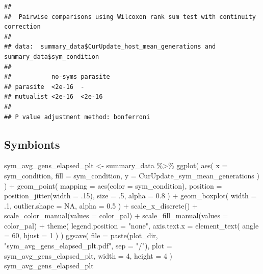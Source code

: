 \documentclass[
]{book}
\newenvironment{Shaded}{\begin{snugshade}}{\end{snugshade}}
\newcommand{\AttributeTok}[1]{\textcolor[rgb]{0.77,0.63,0.00}{#1}}
\newcommand{\ConstantTok}[1]{\textcolor[rgb]{0.00,0.00,0.00}{#1}}
\newcommand{\DecValTok}[1]{\textcolor[rgb]{0.00,0.00,0.81}{#1}}
\newcommand{\FloatTok}[1]{\textcolor[rgb]{0.00,0.00,0.81}{#1}}
\newcommand{\FunctionTok}[1]{\textcolor[rgb]{0.00,0.00,0.00}{#1}}
\newcommand{\NormalTok}[1]{#1}
\newcommand{\OtherTok}[1]{\textcolor[rgb]{0.56,0.35,0.01}{#1}}
\newcommand{\SpecialCharTok}[1]{\textcolor[rgb]{0.00,0.00,0.00}{#1}}
\newcommand{\StringTok}[1]{\textcolor[rgb]{0.31,0.60,0.02}{#1}}
\begin{document}
\begin{verbatim}
## 
##  Pairwise comparisons using Wilcoxon rank sum test with continuity correction 
## 
## data:  summary_data$CurUpdate_host_mean_generations and summary_data$sym_condition 
## 
##           no-syms parasite
## parasite  <2e-16  -       
## mutualist <2e-16  <2e-16  
## 
## P value adjustment method: bonferroni
\end{verbatim}

\hypertarget{symbionts}{%
\subsection{Symbionts}\label{symbionts}}

\begin{Shaded}
\begin{Highlighting}[]
\NormalTok{sym\_avg\_gens\_elapsed\_plt }\OtherTok{\textless{}{-}}\NormalTok{ summary\_data }\SpecialCharTok{\%\textgreater{}\%}
  \FunctionTok{ggplot}\NormalTok{(}
    \FunctionTok{aes}\NormalTok{(}
      \AttributeTok{x =}\NormalTok{ sym\_condition,}
      \AttributeTok{fill =}\NormalTok{ sym\_condition,}
      \AttributeTok{y =}\NormalTok{ CurUpdate\_sym\_mean\_generations}
\NormalTok{    )}
\NormalTok{  ) }\SpecialCharTok{+}
  \FunctionTok{geom\_point}\NormalTok{(}
    \AttributeTok{mapping =} \FunctionTok{aes}\NormalTok{(}\AttributeTok{color =}\NormalTok{ sym\_condition),}
    \AttributeTok{position =} \FunctionTok{position\_jitter}\NormalTok{(}\AttributeTok{width =}\NormalTok{ .}\DecValTok{15}\NormalTok{),}
    \AttributeTok{size =}\NormalTok{ .}\DecValTok{5}\NormalTok{,}
    \AttributeTok{alpha =} \FloatTok{0.8}
\NormalTok{  ) }\SpecialCharTok{+}
  \FunctionTok{geom\_boxplot}\NormalTok{(}
    \AttributeTok{width =}\NormalTok{ .}\DecValTok{1}\NormalTok{,}
    \AttributeTok{outlier.shape =} \ConstantTok{NA}\NormalTok{,}
    \AttributeTok{alpha =} \FloatTok{0.5}
\NormalTok{  ) }\SpecialCharTok{+}
  \FunctionTok{scale\_x\_discrete}\NormalTok{() }\SpecialCharTok{+}
  \FunctionTok{scale\_color\_manual}\NormalTok{(}\AttributeTok{values =}\NormalTok{ color\_pal) }\SpecialCharTok{+}
  \FunctionTok{scale\_fill\_manual}\NormalTok{(}\AttributeTok{values =}\NormalTok{ color\_pal) }\SpecialCharTok{+}
  \FunctionTok{theme}\NormalTok{(}
    \AttributeTok{legend.position =} \StringTok{"none"}\NormalTok{,}
    \AttributeTok{axis.text.x =} \FunctionTok{element\_text}\NormalTok{(}
      \AttributeTok{angle =} \DecValTok{60}\NormalTok{,}
      \AttributeTok{hjust =} \DecValTok{1}
\NormalTok{    )}
\NormalTok{  )}
\FunctionTok{ggsave}\NormalTok{(}
  \AttributeTok{file =} \FunctionTok{paste}\NormalTok{(plot\_dir, }\StringTok{"sym\_avg\_gens\_elapsed\_plt.pdf"}\NormalTok{, }\AttributeTok{sep =} \StringTok{"/"}\NormalTok{),}
  \AttributeTok{plot =}\NormalTok{ sym\_avg\_gens\_elapsed\_plt,}
  \AttributeTok{width =} \DecValTok{4}\NormalTok{,}
  \AttributeTok{height =} \DecValTok{4}
\NormalTok{)}
\NormalTok{sym\_avg\_gens\_elapsed\_plt}
\end{Highlighting}
\end{Shaded}
\end{document}
